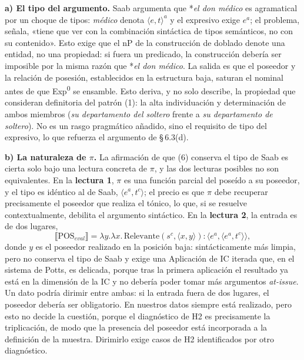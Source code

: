 \documentclass[12pt,a4paper]{article}
\newcommand{\sem}[1]{\ensuremath{\llbracket #1 \rrbracket}}
\begin{document}
\textbf{a) El tipo del argumento.} Saab argumenta que *\textit{el don médico} es agramatical por un choque de tipos: \textit{médico} denota $\langle e,t \rangle^a$ y el expresivo exige $e^a$; el problema, señala, «tiene que ver con la combinación sintáctica de tipos semánticos, no con su contenido». Esto exige que el nP de la construcción de doblado denote una entidad, no una propiedad: si fuera un predicado, la construcción debería ser imposible por la misma razón que *\textit{el don médico}. La salida es que el poseedor y la relación de posesión, establecidos en la estructura baja, saturan el nominal antes de que Exp\textsuperscript{0} se ensamble. Esto deriva, y no solo describe, la propiedad que \textcite{companycompanyhuertaflores2017} consideran definitoria del patrón (1): la alta individuación y determinación de ambos miembros (\textit{su departamento del soltero} frente a \textit{su departamento de soltero}). No es un rasgo pragmático añadido, sino el requisito de tipo del expresivo, lo que refuerza el argumento de \S\,6.3(d).

\textbf{b) La naturaleza de $\pi$.} La afirmación de que (6) conserva el tipo de Saab es cierta solo bajo una lectura concreta de $\pi$, y las dos lecturas posibles no son equivalentes. En la \textbf{lectura 1}, $\pi$ es una función parcial del poseído a su poseedor, y el tipo es idéntico al de Saab, $\langle e^a, t^c \rangle$; el precio es que $\pi$ debe recuperar precisamente el poseedor que realiza el tónico, lo que, si se resuelve contextualmente, debilita el argumento sintáctico. En la \textbf{lectura 2}, la entrada es de dos lugares,
\[
\sem{\text{POS}_{\mathit{eval}}} = \lambda y.\lambda x.\, \text{Relevante}(s^c, \langle x, y \rangle) : \langle e^a, \langle e^a, t^c \rangle \rangle,
\]
donde $y$ es el poseedor realizado en la posición baja: sintácticamente más limpia, pero no conserva el tipo de Saab y exige una Aplicación de IC iterada que, en el sistema de Potts, es delicada, porque tras la primera aplicación el resultado ya está en la dimensión de la IC y no debería poder tomar más argumentos \textit{at-issue}. Un dato podría dirimir entre ambas: si la entrada fuera de dos lugares, el poseedor debería ser obligatorio. En nuestros datos siempre está realizado, pero esto no decide la cuestión, porque el diagnóstico de H2 es precisamente la triplicación, de modo que la presencia del poseedor está incorporada a la definición de la muestra. Dirimirlo exige casos de H2 identificados por otro diagnóstico.
\end{document}
